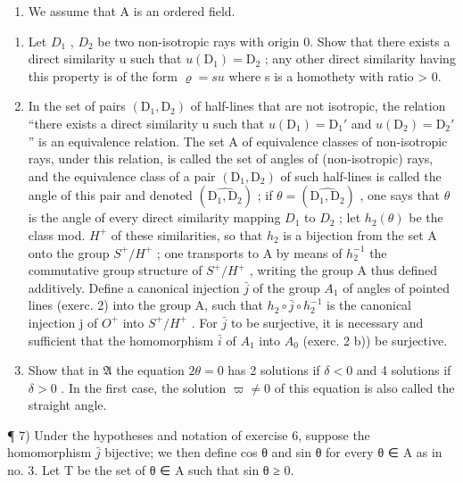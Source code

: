 \begin{enumerate}
\def\labelenumi{\arabic{enumi})}
\setcounter{enumi}{5}
\tightlist
\item
  We assume that A is an ordered field.
\end{enumerate}

\begin{enumerate}
\def\labelenumi{\alph{enumi})}
\item
  Let \(D_{1}\) , \(D_{2}\) be two non-isotropic rays with origin 0. Show that there exists a direct similarity u such that \(u(\mathrm{D}_{1}) = \mathrm{D}_{2}\) ; any other direct similarity having this property is of the form \(\varrho = su\) where s is a homothety with ratio \textgreater{} 0.
\item
  In the set of pairs \((\mathrm{D}_{1}, \mathrm{D}_{2})\) of half-lines that are not isotropic, the relation “there exists a direct similarity u such that \(u(\mathrm{D}_{1}) = \mathrm{D}_{1}'\) and \(u(\mathrm{D}_{2}) = \mathrm{D}_{2}'\) ” is an equivalence relation. The set A of equivalence classes of non-isotropic rays, under this relation, is called the set of angles of (non-isotropic) rays, and the equivalence class of a pair \((\mathrm{D}_{1}, \mathrm{D}_{2})\) of such half-lines is called the angle of this pair and denoted \((\widehat{\mathrm{D}_{1}, \mathrm{D}_{2}})\) ; if \(\theta = (\widehat{\mathrm{D}_{1}, \mathrm{D}_{2}})\) , one says that \(\theta\) is the angle of every direct similarity mapping \(D_{1}\) to \(D_{2}\) ; let \(h_{2}(\theta)\) be the class mod. \(H^{+}\) of these similarities, so that \(h_{2}\) is a bijection from the set A onto the group \(S^{+}/H^{+}\) ; one transports to A by means of \(h_{2}^{-1}\) the commutative group structure of \(S^{+}/H^{+}\) , writing the group A thus defined additively. Define a canonical injection \(\bar{j}\) of the group \(A_{1}\) of angles of pointed lines (exerc. 2) into the group A, such that \(h_{2} \circ \bar{j} \circ h_{2}^{-1}\) is the canonical injection j of \(O^{+}\) into \(S^{+}/H^{+}\) . For \(\bar{j}\) to be surjective, it is necessary and sufficient that the homomorphism \(\bar{i}\) of \(A_{1}\) into \(A_{0}\) (exerc. 2 b)) be surjective.
\item
  Show that in \(\mathfrak{A}\) the equation \(2\theta = 0\) has 2 solutions if \(\delta < 0\) and 4 solutions if \(\delta > 0\) . In the first case, the solution \(\varpi \neq 0\) of this equation is also called the straight angle.
\end{enumerate}

¶ 7) Under the hypotheses and notation of exercise 6, suppose the homomorphism \(\bar{j}\) bijective; we then define cos θ and sin θ for every θ ∈ A as in no. 3. Let T be the set of θ ∈ A such that sin θ ≥ 0.

